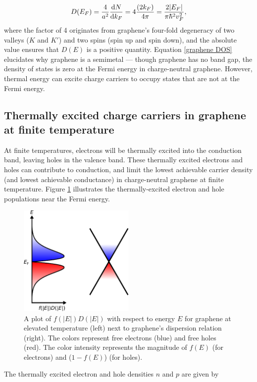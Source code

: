 \documentclass{beavtex_dub_edit}
\begin{document}
\begin{equation}
    D(E_F) = \frac{4}{a^2} \derivative{N}{k_F} = 4\frac{(2k_F)}{4 \pi} = \frac{2\abs{E_F}}{\pi \hbar^2 v_F^2}, \label{graphene DOS}
\end{equation}
where the factor of 4 originates from graphene's four-fold degeneracy of two valleys ($K$ and $K'$) and two spins (spin up and spin down), and the absolute value ensures that $D(E)$ is a positive quantity. Equation \ref{graphene DOS} elucidates why graphene is a semimetal — though graphene has no band gap, the density of states is zero at the Fermi energy in charge-neutral graphene. However, thermal energy can excite charge carriers to occupy states that are not at the Fermi energy.

\subsection{Thermally excited charge carriers in graphene at finite temperature}
At finite temperatures, electrons will be thermally excited into the conduction band, leaving holes in the valence band. These thermally excited electrons and holes can contribute to conduction, and limit the lowest achievable carrier density (and lowest achievable conductance) in charge-neutral graphene at finite temperature. Figure \ref{graphene at elevated T plot} illustrates the thermally-excited electron and hole populations near the Fermi energy. 
\begin{figure}
    \includegraphics[width = 0.5\textwidth]{graphene theory 3.pdf}
    \caption{A plot of $f(|E|)D(|E|)$ with respect to energy $E$ for graphene at elevated temperature (left) next to graphene's dispersion relation (right). The colors represent free electrons (blue) and free holes (red). The color intensity represents the magnitude of $f(E)$ (for electrons) and ($1-f(E)$) (for holes).}
    \label{graphene at elevated T plot}
\end{figure}
The thermally excited electron and hole densities $n$ and $p$ are given by
\end{document}
